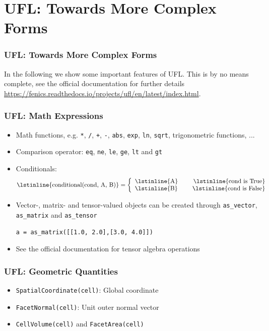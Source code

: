 \documentclass[aspectratio=169,11pt]{beamer}
\theoremstyle{definition}
\begin{document}
\section{UFL: Towards More Complex Forms}

\begin{frame}
  \frametitle{UFL: Towards More Complex Forms}
  In the following we show some important features of UFL. This is by no means
  complete, see the official documentation for further details
  \url{https://fenics.readthedocs.io/projects/ufl/en/latest/index.html}.
\end{frame}

\begin{frame}[fragile]
  \frametitle{UFL: Math Expressions}
  \begin{itemize}
  \item Math functions, e.g. \lstinline{*}, \lstinline{/}, \lstinline{+},
    \lstinline{-}, \lstinline{abs}, \lstinline{exp}, \lstinline{ln},
    \lstinline{sqrt}, trigonometric functions, ...
  \item Comparison operator: \lstinline{eq}, \lstinline{ne}, \lstinline{le},
    \lstinline{ge}, \lstinline{lt} and \lstinline{gt}
  \item Conditionals:
    \begin{displaymath}
      \text{\lstinline{conditional(cond, A, B)}} = \left\{
        \begin{array}{lr}
          \text{\lstinline{A}}\ \ \ \ & \text{\lstinline{cond is True}} \\
          \text{\lstinline{B}} & \text{\lstinline{cond is False}}
        \end{array}
      \right.
    \end{displaymath}
  \item Vector-, matrix- and tensor-valued objects can be created through
    \lstinline{as_vector}, \lstinline{as_matrix} and \lstinline{as_tensor}
    \begin{lstlisting}
a = as_matrix([[1.0, 2.0],[3.0, 4.0]])
    \end{lstlisting}
  \item See the official documentation for tensor algebra operations
  \end{itemize}
\end{frame}

\begin{frame}[fragile]
  \frametitle{UFL: Geometric Quantities}
  \begin{itemize}
  \item \lstinline{SpatialCoordinate(cell)}: Global coordinate
  \item \lstinline{FacetNormal(cell)}: Unit outer normal vector
  \item \lstinline{CellVolume(cell)} and   \lstinline{FacetArea(cell)}
  \end{itemize}
\end{frame}
\end{document}
